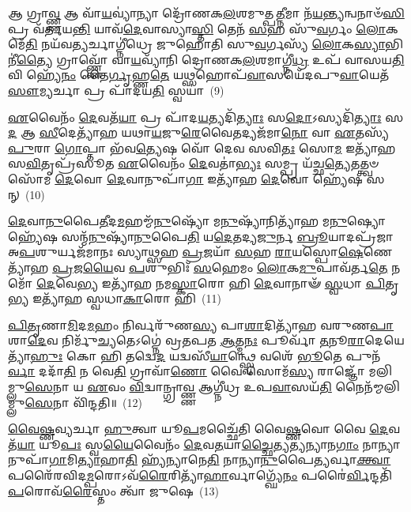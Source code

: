 𑌆 𑌗𑍍𑌰𑌾\-\ul{𑌵𑍍𑌣𑍍𑌣} 𑌆 𑌵𑌾᳴\-\ul{𑌯}\-𑌵𑍍𑌯𑌾॑𑌨𑍍𑌯𑌾 𑌦𑍍𑌰𑍋᳴𑌣𑌕\-\ul{𑌲}\-𑌶𑌮𑍁𑌤𑍍𑌪\-\ul{𑌤𑍍𑌨𑍀}\-𑌮𑌾 𑌨᳴\-\ul{𑌯}\-𑌨𑍍𑌤𑍍𑌯𑌨𑍍𑌵𑌨𑌾𑍞᳴\-\ul{𑌸𑌿} 𑌪𑍍𑌰 𑌵᳴𑌰𑍍𑌤𑌯\-\ul{𑌨𑍍𑌤𑌿} 𑌯𑌾𑌵᳴\-\ul{𑌦𑍇}\-𑌵𑌾𑌸𑍍𑌯𑌾\-\ul{𑌸𑍍𑌤𑌿} 𑌤𑍇𑌨᳴ \ul{𑌸}\-𑌹 𑌸𑍁᳴\-\ul{𑌵}\-𑌰𑍍𑌗𑌂 \ul{𑌲𑍋}\-𑌕𑌮𑍇᳴\-\ul{𑌤𑌿} 𑌨𑌯᳴𑌵\-\ul{𑌤𑍍𑌯}\-𑌰𑍍𑌚𑌾𑌗𑍍𑌨𑍀॑𑌧𑍍𑌰𑍇 𑌜𑍁𑌹𑍋𑌤𑌿 𑌸𑍁\-\ul{𑌵}\-𑌰𑍍𑌗𑌸𑍍𑌯᳴ \ul{𑌲𑍋}\-𑌕\-\ul{𑌸𑍍𑌯𑌾}\-𑌭𑌿𑌨𑍀॑\-\ul{𑌤𑍍𑌯𑍈} 𑌗𑍍𑌰𑌾𑌵𑍍𑌣𑍍𑌣𑍋᳴ 𑌵𑌾\-\ul{𑌯}\-𑌵𑍍𑌯𑌾᳴𑌨𑌿 𑌦𑍍𑌰𑍋𑌣𑌕\-\ul{𑌲}\-𑌶𑌮𑌾𑌗𑍍𑌨𑍀॑\-\ul{𑌧𑍍𑌰} 𑌉𑌪᳴ 𑌵𑌾𑌸𑌯\-\ul{𑌤𑌿} 𑌵𑌿 𑌹𑍍𑌯𑍇᳴\-\ul{𑌨𑌂} 𑌤𑍈\-\ul{𑌰𑍍𑌗𑍃}\-𑌹𑍍𑌣\-\ul{𑌤𑍇} 𑌯\-\ul{𑌥𑍍𑌸}\-𑌹𑍋𑌪᳴\-\ul{𑌵𑌾}\-𑌸𑌯𑍇᳴𑌦𑌪𑍁\-\ul{𑌵𑌾}\-𑌯𑍇𑌤᳴ \ul{𑌸𑍗}\-𑌮𑍍𑌯𑌰𑍍𑌚𑌾 𑌪𑍍𑌰 𑌪𑌾᳴𑌦𑌯\-\ul{𑌤𑌿} 𑌸𑍍𑌵𑌯𑌾॑~(9)

\-\ul{𑌏}\-𑌵𑍈𑌨𑌂᳴ \ul{𑌦𑍇}\-𑌵𑌤᳴\-\ul{𑌯𑌾} 𑌪𑍍𑌰 𑌪𑌾᳴𑌦\-\ul{𑌯}\-𑌤𑍍𑌯𑌦𑌿᳴\-\ul{𑌤𑍍𑌯𑌾𑌃} 𑌸\-\ul{𑌦𑍋}\-\-𑌽𑌸𑍍𑌯𑌦𑌿᳴\-\ul{𑌤𑍍𑌯𑌾𑌃} 𑌸\-\ul{𑌦} 𑌆 \ul{𑌸𑍀}\-𑌦𑍇𑌤𑍍𑌯𑌾᳴𑌹 𑌯𑌥𑌾\-\ul{𑌯}\-𑌜𑍁\-\ul{𑌰𑍇}\-𑌵𑍈𑌤𑌦𑍍𑌯𑌜᳴𑌮𑌾\-\ul{𑌨𑍋} 𑌵𑌾 \ul{𑌏}\-𑌤𑌸𑍍𑌯᳴ \ul{𑌪𑍁}\-𑌰𑌾 \ul{𑌗𑍋}\-𑌪𑍍𑌤𑌾 𑌭᳴𑌵\-\ul{𑌤𑍍𑌯𑍇}\-𑌷 𑌵𑍋᳴ 𑌦𑍇𑌵 𑌸𑌵𑌿\-\ul{𑌤𑌃} 𑌸𑍋\-\ul{𑌮} 𑌇𑌤𑍍𑌯𑌾᳴𑌹 𑌸\-\ul{𑌵𑌿}\-𑌤𑍃𑌪𑍍𑌰᳴𑌸𑍂𑌤 \ul{𑌏}\-𑌵𑍈𑌨𑌂᳴ \ul{𑌦𑍇}\-𑌵𑌤𑌾॑\-\ul{𑌭𑍍𑌯𑌃} 𑌸𑌮𑍍𑌪𑍍𑌰 𑌯᳴𑌚𑍍𑌛\-\ul{𑌤𑍍𑌯𑍇}\-𑌤𑌤𑍍𑌤𑍍𑌵𑍞 𑌸𑍋᳴𑌮 \ul{𑌦𑍇}\-𑌵𑍋 \ul{𑌦𑍇}\-𑌵𑌾𑌨𑍁𑌪𑌾᳴\-\ul{𑌗𑌾} 𑌇𑌤𑍍𑌯𑌾᳴𑌹 \ul{𑌦𑍇}\-𑌵𑍋 𑌹𑍍𑌯𑍇᳴𑌷 𑌸𑌨𑍍~(10)

\-\ul{𑌦𑍇}\-𑌵𑌾\-\ul{𑌨𑍁}\-𑌪𑍈\-\ul{𑌤𑍀}\-𑌦\-\ul{𑌮}\-𑌹𑌮𑍍𑌮᳴\-\ul{𑌨𑍁}\-𑌷𑍍𑌯𑍋᳴ 𑌮\-\ul{𑌨𑍁}\-𑌷𑍍𑌯𑌾᳴𑌨𑌿𑌤𑍍𑌯𑌾᳴𑌹 𑌮\-\ul{𑌨𑍁}\-𑌷𑍍𑌯𑍋  𑌹𑍍𑌯𑍇᳴𑌷 𑌸𑌨𑍍𑌮᳴\-\ul{𑌨𑍁}\-𑌷𑍍𑌯𑌾᳴\-\ul{𑌨𑍁}\-𑌪𑍈\-\ul{𑌤𑌿} 𑌯\-\ul{𑌦𑍇}\-𑌤𑌦𑍍𑌯\-\ul{𑌜𑍁}\-𑌰𑍍𑌨 \ul{𑌬𑍍𑌰𑍂}\-𑌯𑌾𑌦𑌪𑍍𑌰᳴𑌜𑌾 𑌅\-\ul{𑌪}\-𑌶𑍁𑌰𑍍𑌯𑌜᳴𑌮𑌾𑌨𑌃 𑌸𑍍𑌯𑌾\-\ul{𑌥𑍍𑌸}\-𑌹 \ul{𑌪𑍍𑌰}\-𑌜𑌯𑌾᳴ \ul{𑌸}\-𑌹 \ul{𑌰𑌾}\-𑌯𑌸𑍍𑌪𑍋\-\ul{𑌷𑍇}\-𑌣𑍇𑌤𑍍𑌯𑌾᳴𑌹 \ul{𑌪𑍍𑌰}\-𑌜\-\ul{𑌯𑍈}\-𑌵 \ul{𑌪}\-𑌶𑍁𑌭𑌿𑌃᳴ \ul{𑌸}\-𑌹𑍇𑌮𑌂 \ul{𑌲𑍋}\-𑌕\-\ul{𑌮𑍁}\-𑌪𑌾𑌵᳴𑌰𑍍𑌤\-\ul{𑌤𑍇} 𑌨𑌮𑍋᳴ \ul{𑌦𑍇}\-𑌵𑍇\-\ul{𑌭𑍍𑌯} 𑌇𑌤𑍍𑌯𑌾᳴𑌹 𑌨𑌮\-\ul{𑌸𑍍𑌕𑌾}\-𑌰𑍋 𑌹𑌿 \ul{𑌦𑍇}\-𑌵𑌾𑌨𑌾𑍟᳴ \ul{𑌸𑍍𑌵}\-𑌧𑌾 \ul{𑌪𑌿}\-𑌤𑍃\-\ul{𑌭𑍍𑌯} 𑌇𑌤𑍍𑌯𑌾᳴𑌹 𑌸𑍍𑌵𑌧𑌾\-\ul{𑌕𑌾}\-𑌰𑍋 𑌹𑌿~(11)

\-\ul{𑌪𑌿}\-\-\ul{𑌤𑍃}\-𑌣𑌾\-\ul{𑌮𑌿}\-𑌦\-\ul{𑌮}\-𑌹𑌂 𑌨𑌿𑌰𑍍𑌵𑌰𑍁᳴𑌣\-\ul{𑌸𑍍𑌯} 𑌪𑌾\-\ul{𑌶𑌾}\-𑌦𑌿𑌤𑍍𑌯𑌾᳴𑌹 𑌵𑌰𑍁𑌣\-\ul{𑌪𑌾}\-𑌶𑌾\-\ul{𑌦𑍇}\-𑌵 𑌨𑌿𑌰𑍍𑌮𑍁᳴\-\ul{𑌚𑍍𑌯}\-𑌤𑍇\-𑌽𑌗𑍍𑌨𑍇॑ 𑌵𑍍𑌰𑌤𑌪𑌤 \ul{𑌆}\-𑌤𑍍𑌮\-\ul{𑌨𑌃} 𑌪𑍂𑌰𑍍𑌵𑌾᳴ \ul{𑌤}\-𑌨𑍂\-\ul{𑌰𑌾}\-𑌦𑍇𑌯𑍇𑌤𑍍𑌯𑌾᳴\-\ul{𑌹𑍁𑌃} 𑌕𑍋 𑌹𑌿 𑌤𑌦𑍍𑌵𑍇\-\ul{𑌦} 𑌯𑌦𑍍𑌵𑌸𑍀᳴\-\ul{𑌯𑌾}\-𑌨𑍍𑌥𑍍𑌸𑍍𑌵𑍇 𑌵𑌶𑍇᳴ \ul{𑌭𑍂}\-𑌤𑍇 𑌪𑍁𑌨᳴\-\ul{𑌰𑍍𑌵𑌾} 𑌦𑌦𑌾᳴\-\ul{𑌤𑌿} 𑌨 𑌵𑍇\-\ul{𑌤𑌿} 𑌗𑍍𑌰𑌾𑌵𑌾᳴\-\ul{𑌣𑍋} 𑌵𑍈 𑌸𑍋𑌮᳴\-\ul{𑌸𑍍𑌯} 𑌰𑌾𑌜𑍍𑌞𑍋᳴ 𑌮𑌲𑌿𑌮𑍍𑌲𑍁\-\ul{𑌸𑍇}\-𑌨𑌾 𑌯 \ul{𑌏}\-𑌵𑌂 \ul{𑌵𑌿}\-𑌦𑍍𑌵𑌾𑌨𑍍𑌗𑍍𑌰𑌾\-\ul{𑌵𑍍𑌣𑍍𑌣} 𑌆𑌗𑍍𑌨𑍀॑𑌧𑍍𑌰 𑌉𑌪\-\ul{𑌵𑌾}\-𑌸𑌯᳴\-\ul{𑌤𑌿} 𑌨𑍈𑌨᳴𑌮𑍍𑌮𑌲𑌿𑌮𑍍𑌲𑍁\-\ul{𑌸𑍇}\-𑌨𑌾 𑌵𑌿᳴𑌨𑍍𑌦𑌤𑌿॥~(12)

{\anuvakamend[{𑌅𑌥᳴ 𑌦𑌦\-\ul{𑌤𑍇} 𑌸𑍍𑌵\-\ul{𑌯𑌾} 𑌸𑌨𑍍𑌥𑍍𑌸𑍍𑌵᳴𑌧𑌾\-\ul{𑌕𑌾}\-𑌰𑍋 𑌹𑌿 𑌵𑌿᳴𑌨𑍍𑌦𑌤𑌿}]}%

\-\ul{𑌵𑍈}\-\-\ul{𑌷𑍍𑌣}\-𑌵𑍍𑌯𑌰𑍍𑌚𑌾 \ul{𑌹𑍁}\-𑌤𑍍𑌵𑌾 𑌯𑍂\-\ul{𑌪}\-𑌮𑌚𑍍𑌛𑍈᳴𑌤𑌿 𑌵𑍈\-\ul{𑌷𑍍𑌣}\-𑌵𑍋 𑌵𑍈 \ul{𑌦𑍇}\-𑌵𑌤᳴\-\ul{𑌯𑌾} 𑌯𑍂\-\ul{𑌪𑌃} 𑌸𑍍𑌵\-\ul{𑌯𑍈}\-𑌵𑍈𑌨𑌂᳴ \ul{𑌦𑍇}\-𑌵\-\ul{𑌤}\-𑌯𑌾\-\ul{𑌚𑍍𑌛𑍈}\-𑌤𑍍𑌯\-\ul{𑌤𑍍𑌯}\-𑌨𑍍𑌯𑌾𑌨\-\ul{𑌗𑌾𑌂} 𑌨𑌾𑌨𑍍𑌯𑌾𑌨𑍁𑌪𑌾᳴\-\ul{𑌗𑌾}\-𑌮𑌿\-\ul{𑌤𑍍𑌯𑌾}\-𑌹𑌾\-\ul{𑌤𑌿} 𑌹𑍍𑌯᳴𑌨𑍍𑌯𑌾𑌨𑍇\-\ul{𑌤𑌿} 𑌨𑌾𑌨𑍍𑌯𑌾\-\ul{𑌨𑍁}\-𑌪𑍈\-\ul{𑌤𑍍𑌯}\-𑌰𑍍𑌵𑌾\-\ul{𑌕𑍍𑌤𑍍𑌵𑌾} 𑌪𑌰𑍈᳴𑌰𑌵𑌿𑌦\-\ul{𑌮𑍍𑌪}\-𑌰𑍋\-𑌽𑌵᳴\-\ul{𑌰𑍈}\-𑌰𑌿𑌤𑍍𑌯𑌾᳴\-\ul{𑌹𑌾}\-𑌰𑍍𑌵𑌾𑌗𑍍𑌘𑍍𑌯𑍇᳴\-\ul{𑌨𑌂} 𑌪𑌰𑍈॑\-\ul{𑌰𑍍𑌵𑌿}\-𑌨𑍍𑌦𑌤𑌿᳴ \ul{𑌪}\-𑌰𑍋𑌵᳴\-\ul{𑌰𑍈}\-𑌸𑍍𑌤𑌂 𑌤𑍍𑌵𑌾᳴ 𑌜𑍁𑌷𑍇~(13)

